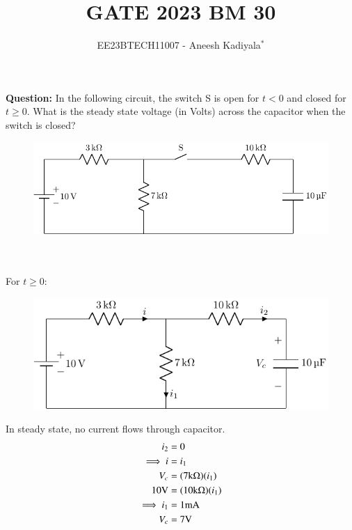 \documentclass[journal,12pt,twocolumn]{IEEEtran}
\theoremstyle{remark}
\begin{document}

\vspace{3cm}

\title{GATE 2023 BM 30}
\author{EE23BTECH11007 - Aneesh Kadiyala$^{*}$%
}
\maketitle
\newpage
\bigskip

\renewcommand{\thefigure}{\theenumi}
\renewcommand{\thetable}{\theenumi}

\vspace{3cm}
\textbf{Question:} In the following circuit, the switch S is open for $t < 0$ and closed for $t \ge 0$.
What is the steady state voltage (in Volts) across the capacitor when the switch is closed?
\begin{figure}[h!]
    \centering
    \includegraphics[width = \columnwidth]{figs/c_fig1.pdf}
\end{figure}
\\
\solution
\\
For $t \ge 0$:
\begin{figure}[h!]
    \centering
    \includegraphics[width=\columnwidth]{figs/c_fig2.pdf}
\end{figure}

In steady state, no current flows through capacitor.
\begin{align}
i_2 &= 0 \\
\implies i &= i_1 \\
V_c &= (7\text{k}\ohm)(i_1) \\
10\text{V} &= (10\text{k}\ohm)(i_1) \\
\implies i_1 &= 1\text{mA} \\
V_c &= 7\text{V}
\end{align}
\end{document}
